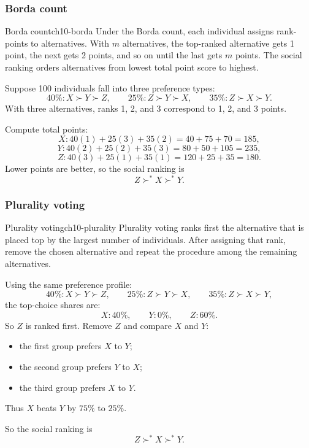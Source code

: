 \subsubsection{Borda count}

\begin{definition}{Borda count}{ch10-borda}
Under the Borda count, each individual assigns rank-points to alternatives. With $m$ alternatives, the top-ranked alternative gets 1 point, the next gets 2 points, and so on until the last gets $m$ points. The social ranking orders alternatives from lowest total point score to highest.
\end{definition}

\begin{examplebox}[title={Worked Example: Borda count}]
Suppose 100 individuals fall into three preference types:
\[
40\%: X \succ Y \succ Z,
\qquad
25\%: Z \succ Y \succ X,
\qquad
35\%: Z \succ X \succ Y.
\]
With three alternatives, ranks 1, 2, and 3 correspond to 1, 2, and 3 points.

Compute total points:
\[
X: 40(1)+25(3)+35(2)=40+75+70=185,
\]
\[
Y: 40(2)+25(2)+35(3)=80+50+105=235,
\]
\[
Z: 40(3)+25(1)+35(1)=120+25+35=180.
\]
Lower points are better, so the social ranking is
\[
\boxed{Z \succ^* X \succ^* Y.}
\]
\end{examplebox}

\subsubsection{Plurality voting}

\begin{definition}{Plurality voting}{ch10-plurality}
Plurality voting ranks first the alternative that is placed top by the largest number of individuals. After assigning that rank, remove the chosen alternative and repeat the procedure among the remaining alternatives.
\end{definition}

\begin{examplebox}[title={Worked Example: Plurality voting}]
Using the same preference profile:
\[
40\%: X \succ Y \succ Z,
\qquad
25\%: Z \succ Y \succ X,
\qquad
35\%: Z \succ X \succ Y,
\]
the top-choice shares are:
\[
X:40\%,\qquad Y:0\%,\qquad Z:60\%.
\]
So $Z$ is ranked first. Remove $Z$ and compare $X$ and $Y$:
\begin{itemize}
    \item the first group prefers $X$ to $Y$;
    \item the second group prefers $Y$ to $X$;
    \item the third group prefers $X$ to $Y$.
\end{itemize}
Thus $X$ beats $Y$ by $75\%$ to $25\%$.

So the social ranking is
\[
\boxed{Z \succ^* X \succ^* Y.}
\]
\end{examplebox}

